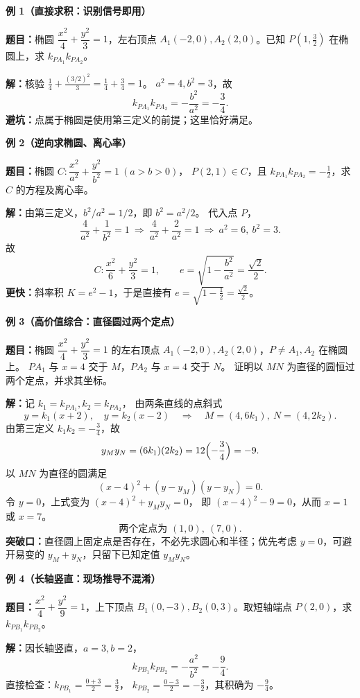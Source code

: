 \begin{examplebox}
\textbf{\textcolor{CExample}{例 1（直接求积：识别信号即用）}}
\par\textbf{题目：}椭圆 $\dfrac{x^2}{4}+\dfrac{y^2}{3}=1$，左右顶点
$A_1(-2,0),A_2(2,0)$。已知 $P(1,\frac32)$ 在椭圆上，求 $k_{PA_1}k_{PA_2}$。
\par\textbf{解：}核验 $\frac14+\frac{(3/2)^2}{3}=\frac14+\frac34=1$。
$a^2=4,b^2=3$，故
\[
 \boxed{k_{PA_1}k_{PA_2}=-\frac{b^2}{a^2}=-\frac34}.
\]
\textbf{避坑：}点属于椭圆是使用第三定义的前提；这里恰好满足。

\medskip
\textbf{\textcolor{CExample}{例 2（逆向求椭圆、离心率）}}
\par\textbf{题目：}椭圆 $C:\dfrac{x^2}{a^2}+\dfrac{y^2}{b^2}=1\ (a>b>0)$，
$P(2,1)\in C$，且 $k_{PA_1}k_{PA_2}=-\frac12$，求 $C$ 的方程及离心率。
\par\textbf{解：}由第三定义，$b^2/a^2=1/2$，即 $b^2=a^2/2$。
代入点 $P$，
\[
 \frac4{a^2}+\frac1{b^2}=1
 \ \Longrightarrow\ \frac4{a^2}+\frac2{a^2}=1
 \ \Longrightarrow\ a^2=6,\ b^2=3.
\]
故
\[
 \boxed{C:\frac{x^2}{6}+\frac{y^2}{3}=1},\qquad
 \boxed{e=\sqrt{1-\frac{b^2}{a^2}}=\frac{\sqrt2}{2}}.
\]
\textbf{更快：}斜率积 $K=e^2-1$，于是直接有 $e=\sqrt{1-\frac12}=\frac{\sqrt2}{2}$。

\medskip
\textbf{\textcolor{CExample}{例 3（高价值综合：直径圆过两个定点）}}
\par\textbf{题目：}椭圆 $\dfrac{x^2}{4}+\dfrac{y^2}{3}=1$ 的左右顶点
$A_1(-2,0),A_2(2,0)$，$P\ne A_1,A_2$ 在椭圆上。
$PA_1$ 与 $x=4$ 交于 $M$，$PA_2$ 与 $x=4$ 交于 $N$。
证明以 $MN$ 为直径的圆恒过两个定点，并求其坐标。

\par\textbf{解：}记 $k_1=k_{PA_1},k_2=k_{PA_2}$，
由两条直线的点斜式
\[
 y=k_1(x+2),\quad y=k_2(x-2)
 \quad\Longrightarrow\quad M=(4,6k_1),\ N=(4,2k_2).
\]
由第三定义 $k_1k_2=-\frac34$，故
\[
 y_My_N=(6k_1)(2k_2)=12\Bigl(-\frac34\Bigr)=-9.
\]
以 $MN$ 为直径的圆满足
\[
 (x-4)^2+(y-y_M)(y-y_N)=0.
\]
令 $y=0$，上式变为 $(x-4)^2+y_My_N=0$，
即 $(x-4)^2-9=0$，从而 $x=1$ 或 $x=7$。
\[
 \boxed{\text{两个定点为 }(1,0),\ (7,0).}
\]
\textbf{突破口：}直径圆上固定点是否存在，不必先求圆心和半径；优先考虑
$y=0$，可避开易变的 $y_M+y_N$，只留下已知定值 $y_My_N$。

\medskip
\textbf{\textcolor{CExample}{例 4（长轴竖直：现场推导不混淆）}}
\par\textbf{题目：}$\dfrac{x^2}{4}+\dfrac{y^2}{9}=1$，上下顶点
$B_1(0,-3),B_2(0,3)$。取短轴端点 $P(2,0)$，求 $k_{PB_1}k_{PB_2}$。
\par\textbf{解：}因长轴竖直，$a=3,b=2$，
\[
 \boxed{k_{PB_1}k_{PB_2}=-\frac{a^2}{b^2}=-\frac94}.
\]
直接检查：$k_{PB_1}=\frac{0+3}{2}=\frac32$，
$k_{PB_2}=\frac{0-3}{2}=-\frac32$，其积确为 $-\frac94$。


\end{examplebox}
